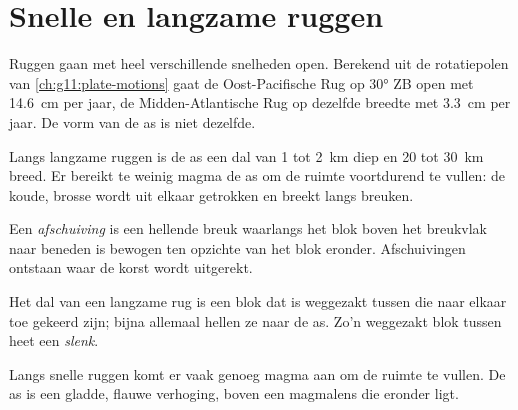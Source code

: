 \section{Snelle en langzame ruggen}

Ruggen gaan met heel verschillende snelheden open. Berekend uit de rotatiepolen van
\cref{ch:g11:plate-motions} gaat de Oost-Pacifische Rug op \ang{30} ZB open met
\qty{14.6}{cm} per jaar, de Midden-Atlantische Rug op dezelfde breedte met
\qty{3.3}{cm} per jaar. De vorm van de as is niet dezelfde.

Langs langzame ruggen is de as een dal van 1 tot \qty{2}{km} diep en 20 tot
\qty{30}{km} breed. Er bereikt te weinig magma de as om de ruimte
voortdurend te vullen: de koude, brosse  wordt uit elkaar getrokken en
breekt langs breuken.

\begin{definition}[Afschuiving]\label{def:g11:ocean-ridges:normal-fault}
Een \emph{afschuiving} is een hellende breuk waarlangs het blok
boven het breukvlak naar beneden is bewogen ten opzichte van het blok eronder.
Afschuivingen ontstaan waar de korst wordt uitgerekt.
\end{definition}

Het dal van een langzame rug is een blok dat is weggezakt tussen  die
naar elkaar toe gekeerd zijn; bijna allemaal hellen ze naar de as. Zo'n weggezakt
blok tussen  heet een \emph{slenk}.

Langs snelle ruggen komt er vaak genoeg magma aan om de ruimte te vullen. De as is
een gladde, flauwe verhoging, boven een magmalens die eronder ligt.

